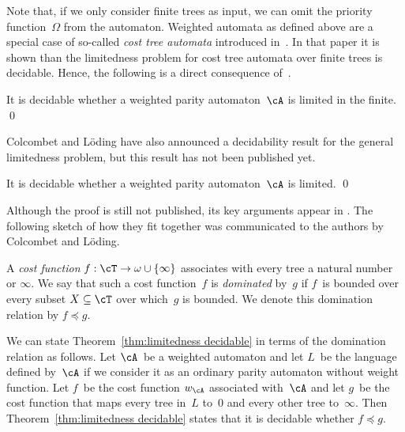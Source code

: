 \documentclass{LMCS}
\begin{document}
Note that, if we only consider finite trees as input, we can omit the priority
function~$\Omega$ from the automaton. Weighted automata as defined above
are a special case of so-called \emph{cost tree automata}
introduced in~\cite{ColcombetLoeding08}.
In that paper it is shown than the limitedness problem for cost tree automata
over finite trees is decidable.
Hence, the following is a direct
consequence of~\cite{ColcombetLoeding08}.
\begin{thm}\label{thm:finite limitedness decidable}
It is decidable whether a weighted parity automaton~$\cA$ is limited in the
finite.
\qed\end{thm}
Colcombet and L\"oding have also announced a decidability result for the
general limitedness problem, but this result has not been published yet.
\begin{thm}\label{thm:limitedness decidable}
It is decidable whether a weighted parity automaton~$\cA$ is limited.
\qed\end{thm}

Although the proof is still not published, its key arguments appear
in \cite{VandenBoom12,Colcombet13}.
The following sketch of how they fit together was communicated to the
authors by Colcombet and L\"oding.

A \emph{cost function} $f : \cT \to \omega \cup \{\infty\}$
associates with every tree a natural number or $\infty$.
We say that such a cost function~$f$ is \emph{dominated} by~$g$ if
$f$~is bounded over every subset $X \subseteq \cT$ over which~$g$ is bounded.
We denote this domination relation by $f \preceq g$.

We can state Theorem~\ref{thm:limitedness decidable} in terms of the
domination relation as follows.
Let $\cA$~be a weighted automaton and let $L$~be the language defined by~$\cA$
if we consider it as an ordinary parity automaton without weight function.
Let $f$~be the cost function $w_\cA$ associated with~$\cA$ and let $g$~be the
cost function that maps every tree in~$L$ to~$0$ and every other tree
to~$\infty$.
Then Theorem~\ref{thm:limitedness decidable} states that it is decidable
whether $f \preceq g$.
\end{document}
